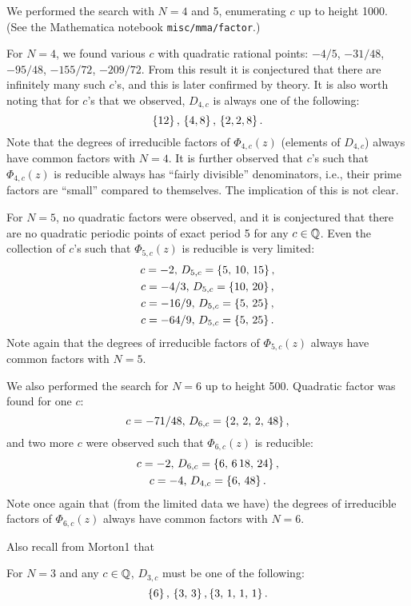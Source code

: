 We performed the search with $N = 4$ and 5, enumerating $c$ up to
height 1000. (See the Mathematica notebook \texttt{misc/mma/factor}.)

For $N = 4$, we found various $c$ with quadratic rational points:
$-4/5$, $-31/48$, $-95/48$, $-155/72$, $-209/72$. From this result it
is conjectured that there are infinitely many such $c$'s, and this is
later confirmed by theory. It is also worth noting that for $c$'s that
we observed, $D_{4,c}$ is always one of the following:
\[
\left\{12\right\},\, \left\{4, 8\right\},\, \left\{2, 2, 8\right\}.
\]
Note that the degrees of irreducible factors of $\Phi_{4,c}(z)$
(elements of $D_{4,c}$) always have common factors with $N = 4$. It is
further observed that $c$'s such that $\Phi_{4,c}(z)$ is reducible
always has ``fairly divisible'' denominators, i.e., their prime
factors are ``small'' compared to themselves. The implication of this
is not clear.

For $N=5$, no quadratic factors were observed, and it is conjectured
that there are no quadratic periodic points of exact period 5 for any
$c \in \mathbb{Q}$. Even the collection of $c$'s such that $\Phi_{5,c}(z)$ is
reducible is very limited:
\[
\begin{gathered}
  c = -2,\, D_{5,c} = \left\{5,\, 10,\, 15\right\},\\
  c = -4/3,\, D_{5,c} = \left\{10,\, 20\right\},\\
  c = -16/9,\, D_{5,c} = \left\{5,\, 25\right\},\\
  c = -64/9,\, D_{5,c} = \left\{5,\, 25\right\}.
\end{gathered}
\]
Note again that the degrees of irreducible factors of $\Phi_{5,c}(z)$ always have common
factors with $N = 5$.

We also performed the search for $N = 6$ up to height 500. Quadratic
factor was found for one $c$:
\[
c = -71/48,\, D_{6,c} = \left\{2,\, 2,\, 2,\, 48\right\},
\]
and two more $c$ were observed such that $\Phi_{6,c}(z)$ is reducible:
\[
\begin{gathered}
  c = -2,\, D_{6,c} = \left\{6,\, 6\, 18,\, 24\right\},\\
  c = -4,\, D_{4,c} = \left\{6,\, 48\right\}.
\end{gathered}
\]
Note once again that (from the limited data we have) the degrees of
irreducible factors of $\Phi_{6,c}(z)$ always have common factors with
$N = 6$.

Also recall from Morton1 that
\begin{theorem}
  For $N = 3$ and any $c \in \mathbb{Q}$, $D_{3, c}$ must be one of the
  following:
  \[
  \left\{6\right\},\, \left\{3,\, 3\right\}, \left\{3,\, 1,\, 1,\, 1\right\}.
  \]
\end{theorem}

